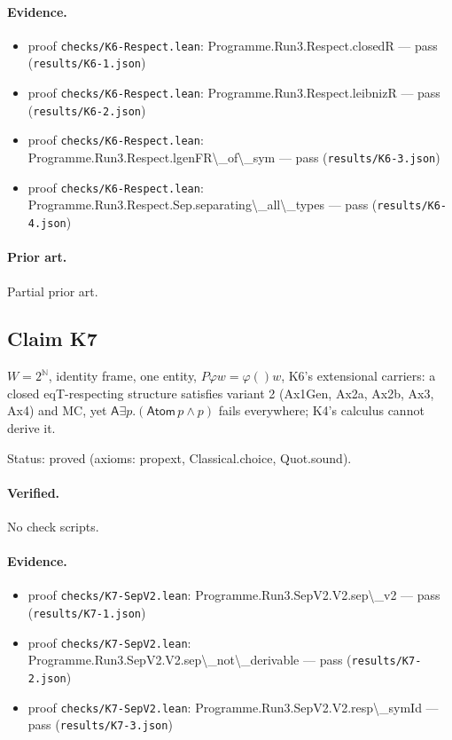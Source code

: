 \documentclass{article}
\begin{document}
\paragraph{Evidence.}
\begin{itemize}
\item proof \texttt{checks/K6-Respect.lean}: Programme.Run3.Respect.closedR --- pass (\texttt{results/K6-1.json})
\item proof \texttt{checks/K6-Respect.lean}: Programme.Run3.Respect.leibnizR --- pass (\texttt{results/K6-2.json})
\item proof \texttt{checks/K6-Respect.lean}: Programme.Run3.Respect.lgenFR\textbackslash{}\_of\textbackslash{}\_sym --- pass (\texttt{results/K6-3.json})
\item proof \texttt{checks/K6-Respect.lean}: Programme.Run3.Respect.Sep.separating\textbackslash{}\_all\textbackslash{}\_types --- pass (\texttt{results/K6-4.json})
\end{itemize}

\paragraph{Prior art.} Partial prior art.

\subsection*{Claim K7}

$W=2^{\mathbb N}$, identity frame, one entity, $P\varphi w=\varphi()w$, K6's extensional carriers: a closed eqT-respecting structure satisfies variant 2 (Ax1Gen, Ax2a, Ax2b, Ax3, Ax4) and MC, yet $\mathsf A\exists p.(\mathsf{Atom}\,p\wedge p)$ fails everywhere; K4's calculus cannot derive it.

Status: proved (axioms: propext, Classical.choice, Quot.sound).

\paragraph{Verified.}
No check scripts.

\paragraph{Evidence.}
\begin{itemize}
\item proof \texttt{checks/K7-SepV2.lean}: Programme.Run3.SepV2.V2.sep\textbackslash{}\_v2 --- pass (\texttt{results/K7-1.json})
\item proof \texttt{checks/K7-SepV2.lean}: Programme.Run3.SepV2.V2.sep\textbackslash{}\_not\textbackslash{}\_derivable --- pass (\texttt{results/K7-2.json})
\item proof \texttt{checks/K7-SepV2.lean}: Programme.Run3.SepV2.V2.resp\textbackslash{}\_symId --- pass (\texttt{results/K7-3.json})
\end{itemize}
\end{document}

